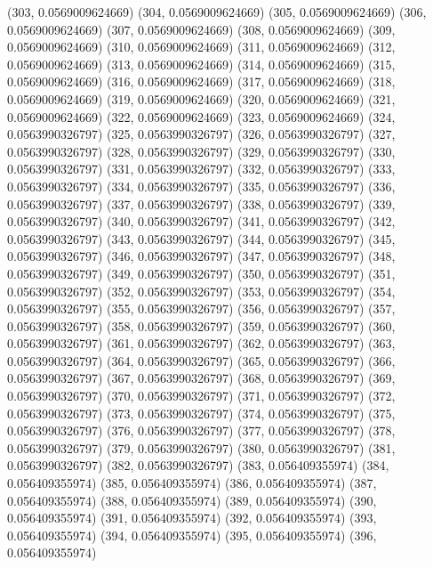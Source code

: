 {					(303, 0.0569009624669)
					(304, 0.0569009624669)
					(305, 0.0569009624669)
					(306, 0.0569009624669)
					(307, 0.0569009624669)
					(308, 0.0569009624669)
					(309, 0.0569009624669)
					(310, 0.0569009624669)
					(311, 0.0569009624669)
					(312, 0.0569009624669)
					(313, 0.0569009624669)
					(314, 0.0569009624669)
					(315, 0.0569009624669)
					(316, 0.0569009624669)
					(317, 0.0569009624669)
					(318, 0.0569009624669)
					(319, 0.0569009624669)
					(320, 0.0569009624669)
					(321, 0.0569009624669)
					(322, 0.0569009624669)
					(323, 0.0569009624669)
					(324, 0.0563990326797)
					(325, 0.0563990326797)
					(326, 0.0563990326797)
					(327, 0.0563990326797)
					(328, 0.0563990326797)
					(329, 0.0563990326797)
					(330, 0.0563990326797)
					(331, 0.0563990326797)
					(332, 0.0563990326797)
					(333, 0.0563990326797)
					(334, 0.0563990326797)
					(335, 0.0563990326797)
					(336, 0.0563990326797)
					(337, 0.0563990326797)
					(338, 0.0563990326797)
					(339, 0.0563990326797)
					(340, 0.0563990326797)
					(341, 0.0563990326797)
					(342, 0.0563990326797)
					(343, 0.0563990326797)
					(344, 0.0563990326797)
					(345, 0.0563990326797)
					(346, 0.0563990326797)
					(347, 0.0563990326797)
					(348, 0.0563990326797)
					(349, 0.0563990326797)
					(350, 0.0563990326797)
					(351, 0.0563990326797)
					(352, 0.0563990326797)
					(353, 0.0563990326797)
					(354, 0.0563990326797)
					(355, 0.0563990326797)
					(356, 0.0563990326797)
					(357, 0.0563990326797)
					(358, 0.0563990326797)
					(359, 0.0563990326797)
					(360, 0.0563990326797)
					(361, 0.0563990326797)
					(362, 0.0563990326797)
					(363, 0.0563990326797)
					(364, 0.0563990326797)
					(365, 0.0563990326797)
					(366, 0.0563990326797)
					(367, 0.0563990326797)
					(368, 0.0563990326797)
					(369, 0.0563990326797)
					(370, 0.0563990326797)
					(371, 0.0563990326797)
					(372, 0.0563990326797)
					(373, 0.0563990326797)
					(374, 0.0563990326797)
					(375, 0.0563990326797)
					(376, 0.0563990326797)
					(377, 0.0563990326797)
					(378, 0.0563990326797)
					(379, 0.0563990326797)
					(380, 0.0563990326797)
					(381, 0.0563990326797)
					(382, 0.0563990326797)
					(383, 0.056409355974)
					(384, 0.056409355974)
					(385, 0.056409355974)
					(386, 0.056409355974)
					(387, 0.056409355974)
					(388, 0.056409355974)
					(389, 0.056409355974)
					(390, 0.056409355974)
					(391, 0.056409355974)
					(392, 0.056409355974)
					(393, 0.056409355974)
					(394, 0.056409355974)
					(395, 0.056409355974)
					(396, 0.056409355974)
}
